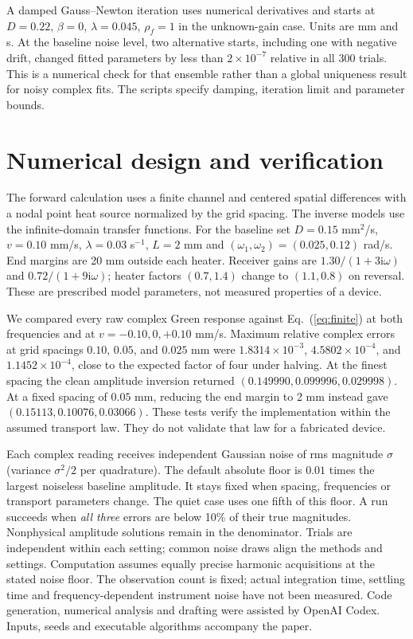 \documentclass[11pt]{article}
\newcommand{\ii}{\mathrm i}
\begin{document}
A damped Gauss--Newton iteration uses numerical derivatives and starts at $D=0.22$, $\beta=0$, $\lambda=0.045$, $\rho_f=1$ in the unknown-gain case. Units are mm and s. At the baseline noise level, two alternative starts, including one with negative drift, changed fitted parameters by less than $2\times10^{-7}$ relative in all 300 trials. This is a numerical check for that ensemble rather than a global uniqueness result for noisy complex fits. The scripts specify damping, iteration limit and parameter bounds.

\section{Numerical design and verification}
The forward calculation uses a finite channel and centered spatial differences with a nodal point heat source normalized by the grid spacing. The inverse models use the infinite-domain transfer functions. For the baseline set $D=0.15$ mm$^2$/s, $v=0.10$ mm/s, $\lambda=0.03$ s$^{-1}$, $L=2$ mm and $(\omega_1,\omega_2)=(0.025,0.12)$ rad/s. End margins are 20 mm outside each heater. Receiver gains are $1.30/(1+3\ii\omega)$ and $0.72/(1+9\ii\omega)$; heater factors $(0.7,1.4)$ change to $(1.1,0.8)$ on reversal. These are prescribed model parameters, not measured properties of a device.

We compared every raw complex Green response against Eq.~(\ref{eq:finite}) at both frequencies and at $v=-0.10,0,+0.10$ mm/s. Maximum relative complex errors at grid spacings $0.10$, $0.05$, and $0.025$ mm were $1.8314\times10^{-3}$, $4.5802\times10^{-4}$, and $1.1452\times10^{-4}$, close to the expected factor of four under halving. At the finest spacing the clean amplitude inversion returned $(0.149990,0.099996,0.029998)$. At a fixed spacing of $0.05$ mm, reducing the end margin to 2 mm instead gave $(0.15113,0.10076,0.03066)$. These tests verify the implementation within the assumed transport law. They do not validate that law for a fabricated device.

Each complex reading receives independent Gaussian noise of rms magnitude $\sigma$ (variance $\sigma^2/2$ per quadrature). The default absolute floor is $0.01$ times the largest noiseless baseline amplitude. It stays fixed when spacing, frequencies or transport parameters change. The quiet case uses one fifth of this floor. A run succeeds when \emph{all three} errors are below 10\% of their true magnitudes. Nonphysical amplitude solutions remain in the denominator. Trials are independent within each setting; common noise draws align the methods and settings. Computation assumes equally precise harmonic acquisitions at the stated noise floor. The observation count is fixed; actual integration time, settling time and frequency-dependent instrument noise have not been measured. Code generation, numerical analysis and drafting were assisted by OpenAI Codex. Inputs, seeds and executable algorithms accompany the paper.
\end{document}
